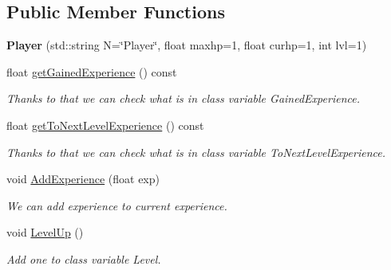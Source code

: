 \subsection*{Public Member Functions}
\begin{DoxyCompactItemize}
\item 
\hypertarget{classPlayer_ae7423d709bb8ce4bd3c0a2abf6acfba0}{}{\bfseries Player} (std\+::string N=\char`\"{}Player\char`\"{}, float maxhp=1, float curhp=1, int lvl=1)\label{classPlayer_ae7423d709bb8ce4bd3c0a2abf6acfba0}

\item 
\hypertarget{classPlayer_a832c45eb6c4c3b7a85098eea14bff5c1}{}float \hyperlink{classPlayer_a832c45eb6c4c3b7a85098eea14bff5c1}{get\+Gained\+Experience} () const \label{classPlayer_a832c45eb6c4c3b7a85098eea14bff5c1}

\begin{DoxyCompactList}\small\item\em Thanks to that we can check what is in class variable Gained\+Experience. \end{DoxyCompactList}\item 
\hypertarget{classPlayer_a87007e274e6588713352a3836e6411a2}{}float \hyperlink{classPlayer_a87007e274e6588713352a3836e6411a2}{get\+To\+Next\+Level\+Experience} () const \label{classPlayer_a87007e274e6588713352a3836e6411a2}

\begin{DoxyCompactList}\small\item\em Thanks to that we can check what is in class variable To\+Next\+Level\+Experience. \end{DoxyCompactList}\item 
\hypertarget{classPlayer_a8b2c3f2f4e2247e2fb394c6868781d9b}{}void \hyperlink{classPlayer_a8b2c3f2f4e2247e2fb394c6868781d9b}{Add\+Experience} (float exp)\label{classPlayer_a8b2c3f2f4e2247e2fb394c6868781d9b}

\begin{DoxyCompactList}\small\item\em We can add experience to current experience. \end{DoxyCompactList}\item 
\hypertarget{classPlayer_aae180f7a4a011ba1fd485e3d8728f489}{}void \hyperlink{classPlayer_aae180f7a4a011ba1fd485e3d8728f489}{Level\+Up} ()\label{classPlayer_aae180f7a4a011ba1fd485e3d8728f489}

\begin{DoxyCompactList}\small\item\em Add one to class variable Level. \end{DoxyCompactList}\end{DoxyCompactItemize}
